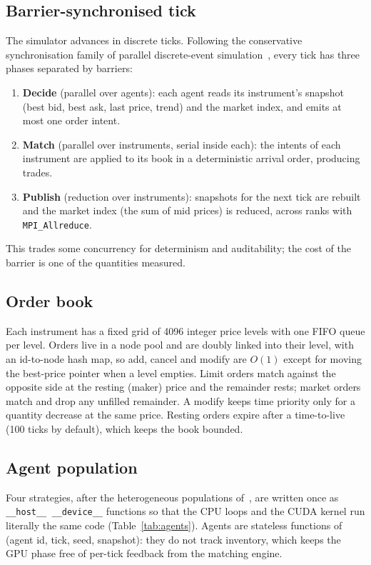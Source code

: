 \subsection{Barrier-synchronised tick}
The simulator advances in discrete ticks. Following the conservative synchronisation family of
parallel discrete-event simulation~\cite{fujimoto1990}, every tick has three phases separated by
barriers:
\begin{enumerate}
\item \textbf{Decide} (parallel over agents): each agent reads its instrument's snapshot (best bid,
  best ask, last price, trend) and the market index, and emits at most one order intent.
\item \textbf{Match} (parallel over instruments, serial inside each): the intents of each instrument
  are applied to its book in a deterministic arrival order, producing trades.
\item \textbf{Publish} (reduction over instruments): snapshots for the next tick are rebuilt and the
  market index (the sum of mid prices) is reduced, across ranks with \texttt{MPI\_Allreduce}.
\end{enumerate}
This trades some concurrency for determinism and auditability; the cost of the barrier is one of
the quantities measured.

\subsection{Order book}
Each instrument has a fixed grid of 4096 integer price levels with one FIFO queue per level. Orders
live in a node pool and are doubly linked into their level, with an id-to-node hash map, so add,
cancel and modify are $O(1)$ except for moving the best-price pointer when a level empties. Limit
orders match against the opposite side at the resting (maker) price and the remainder rests;
market orders match and drop any unfilled remainder. A modify keeps time priority only for a
quantity decrease at the same price. Resting orders expire after a time-to-live (100 ticks by
default), which keeps the book bounded.

\subsection{Agent population}
Four strategies, after the heterogeneous populations of~\cite{chiarella2002,preis2006}, are written
once as \texttt{\_\_host\_\_ \_\_device\_\_} functions so that the CPU loops and the CUDA kernel run
literally the same code (Table~\ref{tab:agents}). Agents are stateless functions of (agent id,
tick, seed, snapshot): they do not track inventory, which keeps the GPU phase free of per-tick
feedback from the matching engine.

